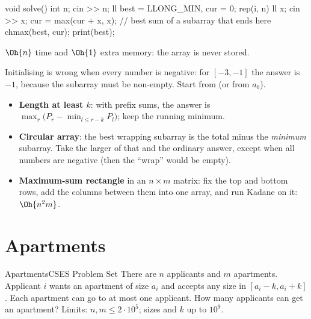 \begin{code}
void solve() {
    int n;
    cin >> n;
    ll best = LLONG_MIN, cur = 0;
    rep(i, n) {
        ll x;
        cin >> x;
        cur = max(cur + x, x);  // best sum of a subarray that ends here
        chmax(best, cur);
    }
    print(best);
}
\end{code}

 $\Oh{n}$ time and $\Oh{1}$ extra memory: the array is never stored.

\begin{pitfall}
Initialising  is wrong when every number is negative: for $[-3, -1]$ the answer is $-1$, because the subarray
must be non-empty. Start from  (or from $a_0$).
\end{pitfall}

\begin{trick}
\begin{itemize}
  \item \textbf{Length at least $k$}: with prefix sums, the answer is $\max_r \bigl(P_r - \min_{l \le r-k} P_l\bigr)$; keep the
        running minimum.
  \item \textbf{Circular array}: the best wrapping subarray is the total minus the \emph{minimum} subarray. Take the larger
        of that and the ordinary answer, except when all numbers are negative (then the ``wrap'' would be empty).
  \item \textbf{Maximum-sum rectangle} in an $n\times m$ matrix: fix the top and bottom rows, add the columns between them
        into one array, and run Kadane on it: $\Oh{n^2 m}$.
\end{itemize}
\end{trick}

\section[Apartments]{Apartments \hfill \silver}\label{wp:apartments}

\begin{statement}{Apartments}{CSES Problem Set}
There are $n$ applicants and $m$ apartments. Applicant $i$ wants an apartment of size $a_i$ and accepts any size in
$[a_i - k, a_i + k]$. Each apartment can go to at most one applicant. How many applicants can get an apartment?
Limits: $n, m \le 2\cdot 10^5$; sizes and $k$ up to $10^9$.
\end{statement}

